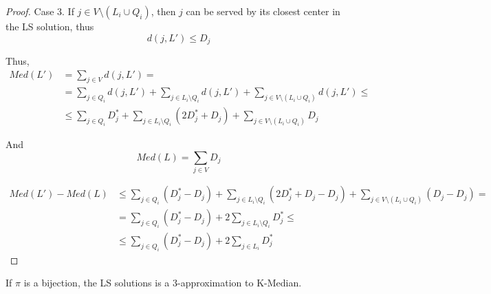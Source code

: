 \begin{proof}
        Case 3. If $j \in V \setminus (L_i \cup Q_i)$, then $j$ can be served by its closest center in the LS solution, thus
        \begin{equation*}
            d(j,L') \leq D_j
        \end{equation*}

        Thus,
        \begin{equation*}
            \begin{split}
                Med(L') &= \sum_{j \in V} d(j,L') =\\
                    &= \sum_{j \in Q_i} d(j,L') + \sum_{j \in L_i \setminus Q_i} d(j,L') + \sum_{j \in V \setminus (L_i \cup Q_i)} d(j,L') \leq\\
                    &\leq \sum_{j \in Q_i} D_j^* + \sum_{j \in L_i \setminus Q_i} (2 D_j^* + D_j) + \sum_{j \in V \setminus (L_i \cup Q_i)} D_j
            \end{split}
        \end{equation*}

        And
        \[ Med(L) = \sum_{j \in V} D_j \]

        \begin{equation*}
            \begin{split}
                Med(L') - Med(L) &\leq \sum_{j \in Q_i} (D_j^* - D_j) + \sum_{j \in L_i \setminus Q_i} (2 D_j^* + D_j - D_j) + \sum_{j \in V \setminus (L_i \cup Q_i)} (D_j - D_j) =\\
                    &= \sum_{j \in Q_i} (D_j^* - D_j) + 2 \sum_{j \in L_i \setminus Q_i} D_j^* \leq\\
                    &\leq \sum_{j \in Q_i} (D_j^* - D_j) + 2 \sum_{j \in L_i} D_j^*
            \end{split}
        \end{equation*}
    \end{proof}

    \begin{theorem}
        If $\pi$ is a bijection, the LS solutions is a $3$-approximation to K-Median.
    \end{theorem}

